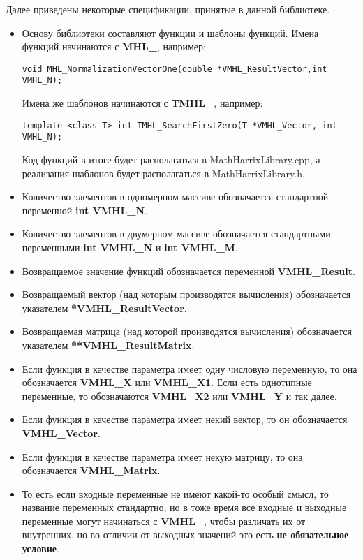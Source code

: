 Далее приведены некоторые спецификации, принятые в данной библиотеке.
\begin{itemize}
\item Основу библиотеки составляют функции и шаблоны функций. Имена функций начинаются с \textbf{MHL\_}, например:
\begin{lstlisting}[label=examplename,caption=Пример названия функции]
void MHL_NormalizationVectorOne(double *VMHL_ResultVector,int VMHL_N);
\end{lstlisting}
Имена же шаблонов начинаются с \textbf{TMHL\_}, например:
\begin{lstlisting}[label=examplename2,caption=Пример названия шаблона функции]
template <class T> int TMHL_SearchFirstZero(T *VMHL_Vector, int VMHL_N);
\end{lstlisting}
Код функций в итоге будет располагаться в MathHarrixLibrary.cpp, а реализация шаблонов будет располагаться в MathHarrixLibrary.h.
\item  Количество элементов в одномерном массиве обозначается стандартной переменной  \textbf{int VMHL\_N}.
\item Количество элементов в двумерном массиве обозначается стандартными переменными  \textbf{int VMHL\_N} и \textbf{int VMHL\_M}.
\item Возвращаемое значение функций обозначается переменной \textbf{VMHL\_Result}.
\item Возвращаемый вектор (над которым производятся вычисления) обозначается указателем \textbf{*VMHL\_ResultVector}.
\item Возвращаемая матрица (над которой производятся вычисления) обозначается указателем \textbf{**VMHL\_ResultMatrix}.
\item Если функция в качестве параметра имеет одну числовую переменную, то она обозначается \textbf{VMHL\_X} или \textbf{VMHL\_X1}. Если есть однотипные переменные, то обозначаются \textbf{VMHL\_X2} или \textbf{VMHL\_Y} и так далее.
\item Если функция в качестве параметра имеет некий вектор, то он обозначается \textbf{VMHL\_Vector}.
\item Если функция в качестве параметра имеет некую матрицу, то она обозначается \textbf{VMHL\_Matrix}.
\item То есть если входные переменные не имеют какой-то особый смысл, то название переменных стандартно, но в тоже время все входные и выходные переменные могут начинаться с \textbf{VMHL\_}, чтобы различать их от внутренних, но во отличии от выходных значений это есть \textbf{не обязательное условие}.
\end{itemize}

